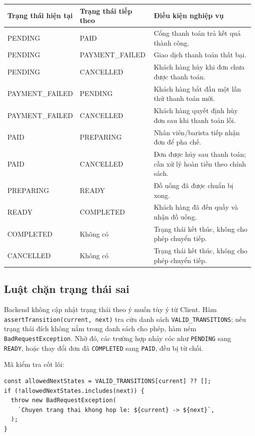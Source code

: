 \begin{center}
\renewcommand{\arraystretch}{1.2}
\begin{tabular}{|p{2.5cm}|p{3.0cm}|p{8.0cm}|}
\hline
\textbf{Trạng thái hiện tại} & \textbf{Trạng thái tiếp theo} & \textbf{Điều kiện nghiệp vụ} \\
\hline
PENDING & PAID & Cổng thanh toán trả kết quả thành công. \\
\hline
PENDING & PAYMENT\_FAILED & Giao dịch thanh toán thất bại. \\
\hline
PENDING & CANCELLED & Khách hàng hủy khi đơn chưa được thanh toán. \\
\hline
PAYMENT\_FAILED & PENDING & Khách hàng bắt đầu một lần thử thanh toán mới. \\
\hline
PAYMENT\_FAILED & CANCELLED & Khách hàng quyết định hủy đơn sau khi thanh toán lỗi. \\
\hline
PAID & PREPARING & Nhân viên/barista tiếp nhận đơn để pha chế. \\
\hline
PAID & CANCELLED & Đơn được hủy sau thanh toán; cần xử lý hoàn tiền theo chính sách. \\
\hline
PREPARING & READY & Đồ uống đã được chuẩn bị xong. \\
\hline
READY & COMPLETED & Khách hàng đã đến quầy và nhận đồ uống. \\
\hline
COMPLETED & Không có & Trạng thái kết thúc, không cho phép chuyển tiếp. \\
\hline
CANCELLED & Không có & Trạng thái kết thúc, không cho phép chuyển tiếp. \\
\hline
\end{tabular}
\end{center}

\subsection{Luật chặn trạng thái sai}

Backend không cập nhật trạng thái theo ý muốn tùy ý từ Client. Hàm \texttt{assertTransition(current, next)} tra cứu danh sách \texttt{VALID\_TRANSITIONS}; nếu trạng thái đích không nằm trong danh sách cho phép, hàm ném \texttt{BadRequestException}. Nhờ đó, các trường hợp nhảy cóc như \texttt{PENDING} sang \texttt{READY}, hoặc thay đổi đơn đã \texttt{COMPLETED} sang \texttt{PAID}, đều bị từ chối.

Mã kiểm tra cốt lõi:
\begin{verbatim}
const allowedNextStates = VALID_TRANSITIONS[current] ?? [];
if (!allowedNextStates.includes(next)) {
  throw new BadRequestException(
    `Chuyen trang thai khong hop le: ${current} -> ${next}`,
  );
}
\end{verbatim}

